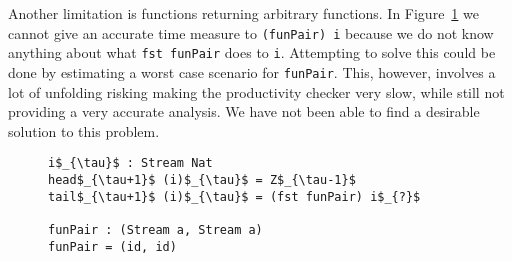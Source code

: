 Another limitation is functions returning arbitrary functions. In Figure~\ref{fig:funList} we cannot give an accurate time measure to \texttt{(funPair) i} because we do not know anything about what \texttt{fst funPair} does to \texttt{i}. Attempting to solve this could be done by estimating a worst case scenario for \texttt{funPair}. This, however, involves a lot of unfolding risking making the productivity checker very slow, while still not providing a very accurate analysis. We have not been able to find a desirable solution to this problem.

\begin{figure}
\begin{Verbatim}[commandchars=\\\{\},codes={\catcode`$=3\catcode`_=8}]
i$_{\tau}$ : Stream Nat
head$_{\tau+1}$ (i)$_{\tau}$ = Z$_{\tau-1}$
tail$_{\tau+1}$ (i)$_{\tau}$ = (fst funPair) i$_{?}$

funPair : (Stream a, Stream a)
funPair = (id, id)
\end{Verbatim}
\caption{}
\label{fig:funList}
\end{figure}